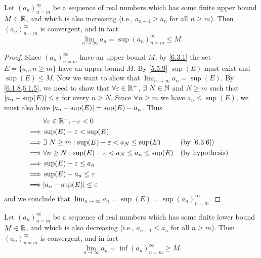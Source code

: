 \begin{prop}\label{6.3.8}
  Let \((a_n)_{n = m}^\infty\) be a sequence of real numbers which has some finite upper bound \(M \in \mathbb{R}\), and which is also increasing (i.e., \(a_{n + 1} \geq a_n\) for all \(n \geq m\)).
  Then \((a_n)_{n = m}^\infty\) is convergent, and in fact
  \[
    \lim_{n \to \infty} a_n = \sup(a_n)_{n = m}^\infty \leq M.
  \]
\end{prop}

\begin{proof}
  Since \((a_n)_{n = m}^\infty\) have an upper bound \(M\), by \cref{6.3.1} the set \(E = \{a_n : n \geq m\}\) have an upper bound \(M\).
  By \cref{5.5.9} \(\sup(E)\) must exist and \(\sup(E) \leq M\).
  Now we want to show that \(\lim_{n \to \infty} a_n = \sup(E)\).
  By \cref{6.1.8,6.1.5}, we need to show that \(\forall \varepsilon \in \mathbb{R}^+\), \(\exists\ N \in \mathbb{N}\) and \(N \geq m\) such that \(\left\lvert a_n - \sup(E)\right\rvert \leq \varepsilon\) for every \(n \geq N\).
  Since \(\forall n \geq m\) we have \(a_n \leq \sup(E)\), we must also have \(\left\lvert a_n - \sup(E)\right\rvert = \sup(E) - a_n\).
  Thus
  \begin{align*}
             & \forall \varepsilon \in \R^+, -\varepsilon < 0                                                     \\
    \implies & \sup(E) - \varepsilon < \sup(E)                                                                    \\
    \implies & \exists\ N \geq m : \sup(E) - \varepsilon < a_N \leq \sup(E)         &  & \text{(by \cref{6.3.6})} \\
    \implies & \forall n \geq N : \sup(E) - \varepsilon < a_N \leq a_n \leq \sup(E) &  & \text{(by hypothesis)}   \\
    \implies & \sup(E) - \varepsilon \leq a_n                                                                     \\
    \implies & \sup(E) - a_n \leq \varepsilon                                                                     \\
    \implies & \abs{a_n - \sup(E)} \leq \varepsilon
  \end{align*}
  and we conclude that \(\lim_{n \to \infty} a_n = \sup(E) = \sup(a_n)_{n = m}^\infty\).
\end{proof}

\begin{ac}\label{ac:6.3.1}
  Let \((a_n)_{n = m}^\infty\) be a sequence of real numbers which has some finite lower bound \(M \in \mathbb{R}\), and which is also decreasing (i.e., \(a_{n + 1} \leq a_n\) for all \(n \geq m\)).
  Then \((a_n)_{n = m}^\infty\) is convergent, and in fact
  \[
    \lim_{n \to \infty} a_n = \inf(a_n)_{n = m}^\infty \geq M.
  \]
\end{ac}

